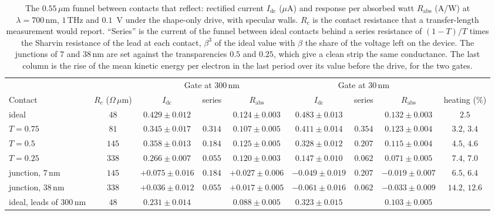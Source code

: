 \documentclass[aps,prapplied,onecolumn,superscriptaddress,floatfix]{revtex4-2}
\newcommand{\um}{\,\mu\mathrm{m}}
\newcommand{\nm}{\,\mathrm{nm}}
\newcommand{\THz}{\,\mathrm{THz}}
\begin{document}
\begin{table}[ht]
\caption{The $0.55\um$ funnel between contacts that reflect: rectified
current $I_{\mathrm{dc}}$ ($\mu$A) and response per absorbed watt
$R_{\mathrm{abs}}$ (A/W) at $\lambda=700\nm$, $1\THz$ and $0.1$~V under
the shape-only drive, with specular walls. $R_{c}$ is the contact
resistance that a transfer-length measurement would report. ``Series'' is
the current of the funnel between ideal contacts behind a series
resistance of $(1-T)/T$ times the Sharvin resistance of the lead at each
contact, $\beta^{3}$ of the ideal value with $\beta$ the share of the voltage
left on the device. The junctions of $7$ and $38\nm$ are set against the
transparencies $0.5$ and $0.25$, which give a clean strip the same
conductance. The last column is the rise of the mean kinetic energy per
electron in the last period over its value before the drive, for the
two gates.}
\label{tab:contacts}
\begin{ruledtabular}
\begin{tabular}{lcccccccc}
 & & \multicolumn{3}{c}{Gate at $300\nm$} & \multicolumn{3}{c}{Gate at $30\nm$} & \\
Contact & $R_{c}$ ($\Omega\um$) & $I_{\mathrm{dc}}$ & series & $R_{\mathrm{abs}}$ & $I_{\mathrm{dc}}$ & series & $R_{\mathrm{abs}}$ & heating (\%) \\
\hline
ideal & $48$ & $0.429\pm0.012$ & & $0.124\pm0.003$ & $0.483\pm0.013$ & & $0.132\pm0.003$ & $2.5$ \\
$T=0.75$ & $81$ & $0.345\pm0.017$ & $0.314$ & $0.107\pm0.005$ & $0.411\pm0.014$ & $0.354$ & $0.123\pm0.004$ & $3.2$, $3.4$ \\
$T=0.5$ & $145$ & $0.358\pm0.013$ & $0.184$ & $0.125\pm0.005$ & $0.328\pm0.012$ & $0.207$ & $0.115\pm0.004$ & $4.5$, $4.6$ \\
$T=0.25$ & $338$ & $0.266\pm0.007$ & $0.055$ & $0.120\pm0.003$ & $0.147\pm0.010$ & $0.062$ & $0.071\pm0.005$ & $7.4$, $7.0$ \\
junction, $7\nm$ & $145$ & $+0.075\pm0.016$ & $0.184$ & $+0.027\pm0.006$ & $-0.049\pm0.019$ & $0.207$ & $-0.019\pm0.007$ & $6.5$, $6.4$ \\
junction, $38\nm$ & $338$ & $+0.036\pm0.012$ & $0.055$ & $+0.017\pm0.005$ & $-0.061\pm0.016$ & $0.062$ & $-0.033\pm0.009$ & $14.2$, $12.6$ \\
ideal, leads of $300\nm$ & $48$ & $0.231\pm0.014$ & & $0.088\pm0.005$ & $0.323\pm0.015$ & & $0.103\pm0.005$ & \\
\end{tabular}
\end{ruledtabular}
\end{table}
\end{document}
